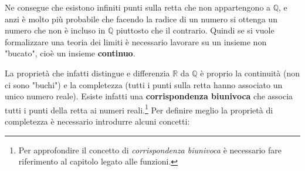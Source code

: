 Ne consegue che esistono infiniti punti sulla retta che non appartengono a 
$\mathbb{Q}$, e anzi è molto più probabile che facendo la radice di un numero 
si ottenga un numero che non è incluso in $\mathbb{Q}$ piuttosto che il 
contrario. Quindi se si vuole formalizzare una teoria dei limiti è necessario 
lavorare su un insieme non "bucato", cioè un insieme \textbf{continuo}.
\bigbreak

La proprietà che infatti distingue e differenzia $\mathbb{R}$ da $\mathbb{Q}$ 
è proprio la continuità (non ci sono "buchi") e la completezza (tutti i punti 
sulla retta hanno associato un unico numero reale). Esiste infatti una 
\textbf{corrispondenza biunivoca} che associa tutti i punti della retta ai 
numeri reali.\footnote{Per approfondire il concetto di \textit{corrispondenza 
biunivoca} è necessario fare riferimento al capitolo legato alle funzioni.}
Per definire meglio la proprietà di completezza è necessario introdurre alcuni 
concetti:

